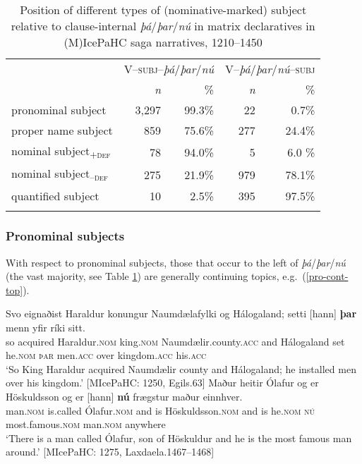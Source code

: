 \documentclass[output=paper,colorlinks,citecolor=brown]{langscibook}
\begin{document}
\begin{table}
\caption{Position of different types of (nominative-marked) subject relative to clause-internal \textit{þá}/\textit{þar}/\textit{nú} in matrix declaratives in (M)IcePaHC saga narratives, 1210--1450}
\label{tab:subjs}
 \begin{tabularx}{.85\textwidth}{lrrrr}
  \lsptoprule
  &   \multicolumn{2}{c}{V--\textsc{subj}--\textit{þá}/\textit{þar}/\textit{nú}} &   \multicolumn{2}{c}{V--\textit{þá}/\textit{þar}/\textit{nú}--\textsc{subj}}\\
   \cmidrule(lr){2-3}   \cmidrule(lr){4-5}
            & \textit{n} & \%  & \textit{n} & \%\\
  \midrule
  pronominal subject  &  3,297  &  99.3\% &    22    &  0.7\%\\
  proper name subject &  859 &   75.6\%  &  277    & 24.4\% \\
  nominal subject\textsubscript{+\textsc{def}}  &  78 &  94.0\%   &   5  & 6.0 \% \\
  nominal subject\textsubscript{--\textsc{def}} &  275 & 21.9\%  &  979    &  78.1\% \\
  quantified subject & 10 & 2.5\% & 395 & 97.5\% \\
  \lspbottomrule
 \end{tabularx}
\end{table}


\subsubsection{Pronominal subjects}

With respect to pronominal subjects, those that occur to the left of \textit{þá}/\textit{þar}/\textit{nú} (the vast majority, see Table \ref{tab:subjs}) are generally continuing topics, e.g.~(\ref{pro-cont-top}).

\ea \label{pro-cont-top}
\ea %
\gll Svo eignaðist Haraldur konungur Naumdælafylki og Hálogaland; setti [hann] \textbf{þar} menn yfir ríki sitt.\\
so acquired Haraldur.\textsc{nom} king.\textsc{nom} Naumdælir.county.\textsc{acc} and Hálogaland set he.\textsc{nom} \textsc{þar} men.\textsc{acc} over kingdom.\textsc{acc} his.\textsc{acc}\\
\glt `So King Haraldur acquired Naumdælir county and Hálogaland; he installed men over his kingdom.' \hfill [MIcePaHC: 1250, Egils.63]
\ex %
\gll Maður heitir Ólafur og er Höskuldsson og er [hann] \textbf{nú} frægstur maður einnhver.\\
man.\textsc{nom} is.called Ólafur.\textsc{nom} and is Höskuldsson.\textsc{nom} and is he.\textsc{nom} \textsc{nú} most.famous.\textsc{nom} man.\textsc{nom} anywhere\\
\glt `There is a man called Ólafur, son of Höskuldur and he is the most famous man around.' \hfill [MIcePaHC: 1275, Laxdaela.1467--1468]
\z 
\z 
 
\end{document}
